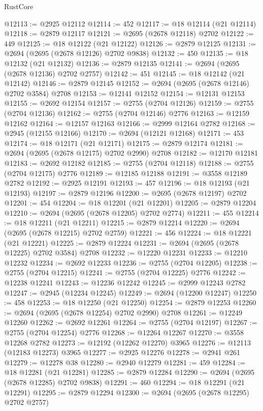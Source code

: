 \begin{lexlean}{RustCore}
\begin{coremodule}
@12113 := @2925 @12112
@12114 := 452
@12117 := @18 @12114 (@21 @12114)
@12118 := @2879 @12117
@12121 := @2695 (@2678 @12118) @2702
@12122 := 449
@12125 := @18 @12122 (@21 @12122)
@12126 := @2879 @12125
@12131 := @2694 (@2695 (@2678 @12126) @2702 @9838)
@12132 := 450
@12135 := @18 @12132 (@21 @12132)
@12136 := @2879 @12135
@12141 := @2694 (@2695 (@2678 @12136) @2702 @2757)
@12142 := 451
@12145 := @18 @12142 (@21 @12142)
@12146 := @2879 @12145
@12152 := @2694 (@2695 (@2678 @12146) @2702 @3584) @2708
@12153 := @12141 @12152
@12154 := @12131 @12153
@12155 := @2692 @12154
@12157 := @2755 (@2704 @12126)
@12159 := @2755 (@2704 @12136)
@12162 := @2755 (@2704 @12146) @2776
@12163 := @12159 @12162
@12164 := @12157 @12163
@12166 := @2999 @12164 @2782
@12168 := @2945 (@12155 @12166)
@12170 := @2694 (@12121 @12168)
@12171 := 453
@12174 := @18 @12171 (@21 @12171)
@12175 := @2879 @12174
@12181 := @2694 (@2695 (@2678 @12175) @2702 @2990) @2708
@12182 := @12170 @12181
@12183 := @2692 @12182
@12185 := @2755 (@2704 @12118)
@12188 := @2755 (@2704 @12175) @2776
@12189 := @12185 @12188
@12191 := @3558 @12189 @2782
@12192 := @2925 @12191
@12193 := 457
@12196 := @18 @12193 (@21 @12193)
@12197 := @2879 @12196
@12200 := @2695 (@2678 @12197) @2702
@12201 := 454
@12204 := @18 @12201 (@21 @12201)
@12205 := @2879 @12204
@12210 := @2694 (@2695 (@2678 @12205) @2702 @2774)
@12211 := 455
@12214 := @18 @12211 (@21 @12211)
@12215 := @2879 @12214
@12220 := @2694 (@2695 (@2678 @12215) @2702 @2759)
@12221 := 456
@12224 := @18 @12221 (@21 @12221)
@12225 := @2879 @12224
@12231 := @2694 (@2695 (@2678 @12225) @2702 @3584) @2708
@12232 := @12220 @12231
@12233 := @12210 @12232
@12234 := @2692 @12233
@12236 := @2755 (@2704 @12205)
@12238 := @2755 (@2704 @12215)
@12241 := @2755 (@2704 @12225) @2776
@12242 := @12238 @12241
@12243 := @12236 @12242
@12245 := @2999 @12243 @2782
@12247 := @2945 (@12234 @12245)
@12249 := @2694 (@12200 @12247)
@12250 := 458
@12253 := @18 @12250 (@21 @12250)
@12254 := @2879 @12253
@12260 := @2694 (@2695 (@2678 @12254) @2702 @2990) @2708
@12261 := @12249 @12260
@12262 := @2692 @12261
@12264 := @2755 (@2704 @12197)
@12267 := @2755 (@2704 @12254) @2776
@12268 := @12264 @12267
@12270 := @3558 @12268 @2782
@12273 := @12192 (@12262 @12270) @3965
@12276 := @12113 (@12183 @12273) @3965
@12277 := @2925 @12276
@12278 := @2941 @261
@12279 := @12278 @38
@12280 := @2940 @12279
@12281 := 459
@12284 := @18 @12281 (@21 @12281)
@12285 := @2879 @12284
@12290 := @2694 (@2695 (@2678 @12285) @2702 @9838)
@12291 := 460
@12294 := @18 @12291 (@21 @12291)
@12295 := @2879 @12294
@12300 := @2694 (@2695 (@2678 @12295) @2702 @2757)

\end{coremodule}
\end{lexlean}
